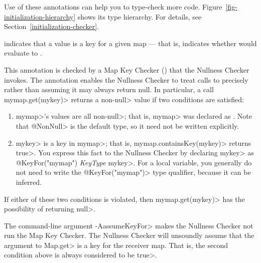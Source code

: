 \noindent
Use of these annotations can help you to type-check more
code.  Figure~\ref{fig-initialization-hierarchy} shows its type hierarchy.  For
details, see Section~\ref{initialization-checker}.



\begin{description}
\item[]
\end{description}
    indicates that a value is a key for a given map --- that is, indicates
    whether  would evaluate to .

This annotation is checked by a Map Key Checker
() that the Nullness Checker
invokes.  The  annotation enables
the Nullness Checker to treat calls to
precisely rather than assuming it may always return null.  In particular,
a call \<mymap.get(mykey)> returns a non-\<null> value if two conditions
are satisfied:
\begin{enumerate}
\item \<mymap>'s values are all non-\<null>; that is, \<mymap> was
  declared as .  Note
  that \<@NonNull> is the default type, so it need not be written explicitly.
\item \<mykey> is a key in \<mymap>; that is, \<mymap.containsKey(mykey)>
  returns \<true>.  You express this fact to the Nullness Checker by
  declaring \<mykey> as \<@KeyFor("mymap") \emph{KeyType} mykey>.  For a
  local variable, you generally do not need to write the
  \<@KeyFor("mymap")> type qualifier, because it can be inferred.
\end{enumerate}
\noindent
If either of these two conditions is violated, then \<mymap.get(mykey)> has
the possibility of returning \<null>.

The command-line argument \<-AassumeKeyFor> makes the Nullness Checker not
run the Map Key Checker.  The Nullness Checker will unsoundly assume that
the argument to \<Map.get> is a key for the receiver map.  That is, the
second condition above is always considered to be \<true>.




